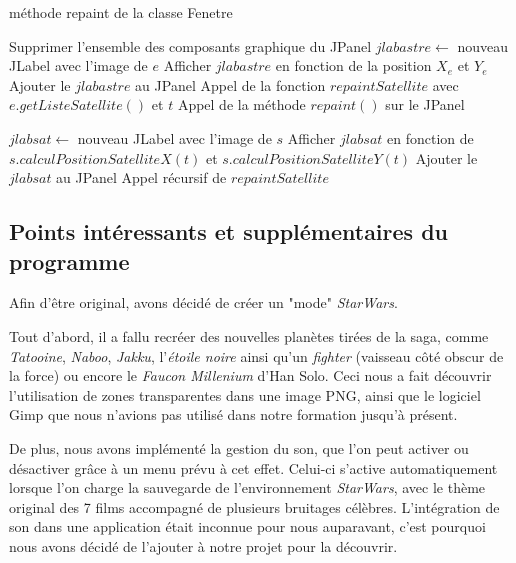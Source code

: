 \documentclass[a4paper,10pt]{article}
\begin{document}
\begin{algorithm}
\caption{méthode repaint de la classe Fenetre}
\begin{algorithmic}
\State Supprimer l'ensemble des composants graphique du JPanel
    \State $jlabastre\gets$ nouveau JLabel avec l'image de $e$
    \State Afficher $jlabastre$ en fonction de la position $X_{e}$ et $Y_{e}$
    \State Ajouter le $jlabastre$ au JPanel
    \State Appel de la fonction $repaintSatellite$ avec $e.getListeSatellite()$ et $t$
\EndFor
\State Appel de la méthode $repaint()$ sur le JPanel
\EndFunction
\end{algorithmic}

\begin{algorithmic}
  \State $jlabsat\gets$ nouveau JLabel avec l'image de $s$
  \State Afficher $jlabsat$ en fonction de $s.calculPositionSatelliteX(t)$ et $s.calculPositionSatelliteY(t)$
  \State Ajouter le $jlabsat$ au JPanel
  \State Appel récursif de $repaintSatellite$
\EndFor
\EndFunction
\end{algorithmic}
\end{algorithm}

\subsection{Points intéressants et supplémentaires du programme}
Afin d'être original, avons décidé de créer un "mode" \textit{StarWars}. 

Tout d'abord, il a fallu recréer des nouvelles planètes tirées de la saga, comme \textit{Tatooine}, \textit{Naboo}, \textit{Jakku}, l'\textit{étoile noire} ainsi qu'un \textit{fighter} (vaisseau côté obscur de la force) ou encore le \textit{Faucon Millenium} d'Han Solo. Ceci nous a fait découvrir l'utilisation de zones transparentes dans une image PNG, ainsi que le logiciel Gimp que nous n'avions pas utilisé dans notre formation jusqu'à présent.

De plus, nous avons implémenté la gestion du son, que l'on peut activer ou désactiver grâce à un menu prévu à cet effet. Celui-ci s'active automatiquement lorsque l'on charge la sauvegarde de l'environnement \textit{StarWars}, avec le thème original des 7 films accompagné de plusieurs bruitages célèbres. L'intégration de son dans une application était inconnue pour nous auparavant, c'est pourquoi nous avons décidé de l'ajouter à notre projet pour la découvrir.
\end{document}
